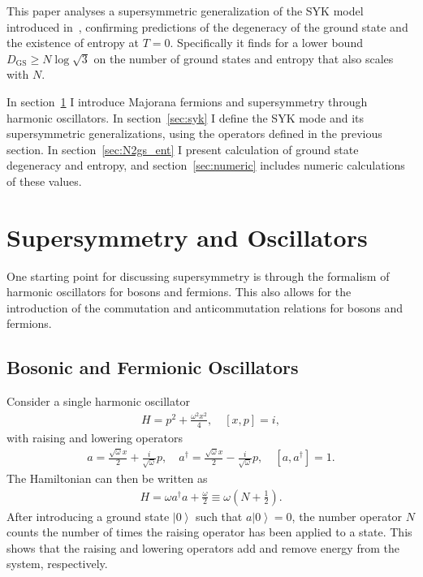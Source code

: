 \documentclass[12pt]{article} %
\renewcommand{\th}[1]{\frac{1}{#1}}
\newcommand{\om}{\omega}
\newcommand{\ket}[1]{\left|#1\right\rangle}
\newcommand{\comm}[2]{\left[#1,#2\right]}
\begin{document}
This paper analyses a supersymmetric generalization of the SYK model introduced in~\cite{fu16}, confirming predictions of the degeneracy of the ground state and the existence of entropy at $T=0$. Specifically it finds for a lower bound $D_\text{GS}\ge N\log\sqrt{3}$ on the number of ground states and entropy that also scales with $N$.

In section~\ref{sec:osc} I introduce Majorana fermions and supersymmetry through harmonic oscillators. In section~\ref{sec:syk} I define the SYK mode and its supersymmetric generalizations, using the operators defined in the previous section. In section~\ref{sec:N2gs_ent} I present calculation of ground state degeneracy and entropy, and section~\ref{sec:numeric} includes numeric calculations of these values.


\section{Supersymmetry and Oscillators} \label{sec:osc}

One starting point for discussing supersymmetry is through the formalism of harmonic oscillators for bosons and fermions. This also allows for the introduction of the commutation and anticommutation relations for bosons and fermions.

\subsection{Bosonic and Fermionic Oscillators} \emph{} \label{sub:bf_osc}

Consider a single harmonic oscillator 
\begin{align}
H = p^2 +\frac{\om^2 x^2}{4},\quad \comm{x}{p} = i, \label{eqn:harmosc}
\end{align}
with raising and lowering operators
\begin{align}
a = \frac{\sqrt{\om}x}{2}+\frac{i}{\sqrt{\om}}p,\quad a^\dag = \frac{\sqrt{\om 
	}x}{2}-\frac{i}{\sqrt{\om}}p,\quad \comm{a}{a^\dag } = 1.
\end{align}
The Hamiltonian can then be written as 
\begin{align}
H = \om a^\dag a + \frac{\om}{2} \equiv \om \left(N + \th{2}\right).
\end{align}
After introducing a ground state $\ket{0}$ such that $a\ket{0} = 0$, the number operator $N$ counts the number of times the raising operator has been applied to a state. This shows that the raising and lowering operators add and remove energy from the system, respectively. 
\end{document}
